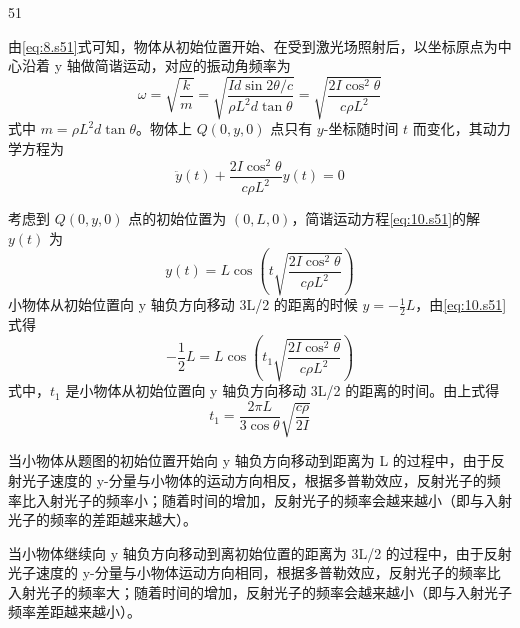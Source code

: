 \begin{solution}{51}
\begin{subsolution}
\begin{subsubsolution}
由\eqref{eq:8.s51}式可知，物体从初始位置开始、在受到激光场照射后，以坐标原点为中心沿着 y 轴做简谐运动，对应的振动角频率为
\begin{equation}
\omega = \sqrt{\frac{k}{m}} = \sqrt{\frac{Id\sin 2\theta / c}{\rho L^{2}d\tan \theta}} = \sqrt{\frac{2I\cos^{2}\theta}{c\rho L^{2}}}
\label{eq:9.s51}
\end{equation}
式中 $m = \rho L^{2}d\tan \theta$。物体上 $Q(0,y,0)$ 点只有 $y$-坐标随时间 $t$ 而变化，其动力学方程为
\begin{equation}
\ddot{y}(t) + \frac{2I\cos^{2}\theta}{c\rho L^{2}} y(t) = 0
\label{eq:10.s51}
\end{equation}
\end{subsubsolution}
\begin{subsubsolution}
考虑到 $Q(0,y,0)$ 点的初始位置为 $(0,L,0)$，简谐运动方程\eqref{eq:10.s51}的解 $y(t)$ 为
\begin{equation}
y(t) = L\cos\left(t\sqrt{\frac{2I\cos^{2}\theta}{c\rho L^{2}}}\right)
\label{eq:11.s51}
\end{equation}
小物体从初始位置向 y 轴负方向移动 3L/2 的距离的时候 $y = -\frac{1}{2}L$，由\eqref{eq:10.s51}式得
\begin{equation}
-\frac{1}{2}L = L\cos\left(t_{1}\sqrt{\frac{2I\cos^{2}\theta}{c\rho L^{2}}}\right)
\label{eq:12.s51}
\end{equation}
式中，$t_{1}$ 是小物体从初始位置向 y 轴负方向移动 3L/2 的距离的时间。由上式得
\begin{equation}
t_{1} = \frac{2\pi L}{3\cos\theta}\sqrt{\frac{c\rho}{2I}}
\label{eq:13.s51}
\end{equation}
\end{subsubsolution}
\end{subsolution}
\begin{subsolution}
当小物体从题图的初始位置开始向 y 轴负方向移动到距离为 L 的过程中，由于反射光子速度的 y-分量与小物体的运动方向相反，根据多普勒效应，反射光子的频率比入射光子的频率小；随着时间的增加，反射光子的频率会越来越小（即与入射光子的频率的差距越来越大）。

当小物体继续向 y 轴负方向移动到离初始位置的距离为 3L/2 的过程中，由于反射光子速度的 y-分量与小物体运动方向相同，根据多普勒效应，反射光子的频率比入射光子的频率大；随着时间的增加，反射光子的频率会越来越小（即与入射光子频率差距越来越小）。
\end{subsolution}
\end{solution}